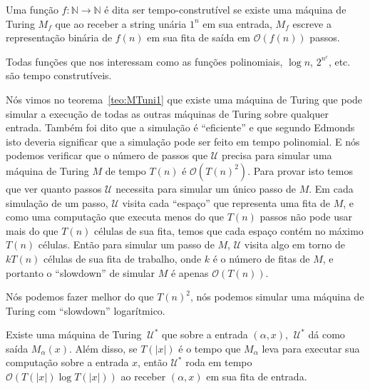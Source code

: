 \begin{defi}  \label{time_constructive_functions}

Uma função $f: \mathbb{N} \to \mathbb{N}$ é dita ser tempo-construtível se existe uma máquina de Turing $M_{f}$ que ao receber a string unária $1^{n}$ em sua entrada, $M_{f}$ escreve a representação binária de $f(n)$ em sua fita de saída em $\mathcal{O}(f(n))$ passos.

\end{defi}

Todas funções que nos interessam como as funções polinomiais, $\log n$, $2^{n^{c}}$, etc. são tempo construtíveis.

Nós vimos no teorema~\ref{teo:MTuni1} que existe uma máquina de Turing que pode simular a execução de todas as outras máquinas de Turing sobre qualquer entrada. Também foi dito que a simulação é ``eficiente'' e que segundo Edmonds isto deveria significar que a simulação pode ser feito em tempo polinomial. E nós podemos verificar que o número de passos que $\mathcal{U}$ precisa para simular uma máquina de Turing $M$ de tempo $T(n)$ é $\mathcal{O}(T(n)^{2})$. Para provar isto temos que ver quanto passos $\mathcal{U}$ necessita para simular um único passo de $M$. Em cada simulação de um passo, $\mathcal{U}$ visita cada ``espaço'' que representa uma fita de $M$, e como uma computação que executa menos do que $T(n)$ passos não pode usar mais do que $T(n)$ células de sua fita, temos que cada espaço contém no máximo $T(n)$ células. Então para simular um passo de $M$, $\mathcal{U}$ visita algo em torno de $kT(n)$ células de sua fita de trabalho, onde $k$ é o número de fitas de $M$, e portanto o ``slowdown'' de simular $M$ é apenas $\mathcal{O}(T(n))$.

Nós podemos fazer melhor do que $T(n)^{2}$, nós podemos simular uma máquina de Turing com ``slowdown'' logarítmico.

\begin{teo} \label{teo:MTuni2}

Existe uma máquina de Turing $~\mathcal{U}^{*}$ que sobre a entrada $(\alpha, x)$, $~\mathcal{U}^{*}$ dá como saída $M_{\alpha}(x)$. Além disso, se $T(\lvert x \rvert)$ é o tempo que $M_{\alpha}$ leva para executar sua computação sobre a entrada $x$, então $\mathcal{U}^{*}$ roda em tempo $\mathcal{O}(T(\lvert x \rvert)\log T(\lvert x \rvert))$ ao receber $(\alpha, x)$ em sua fita de entrada.

\end{teo}

